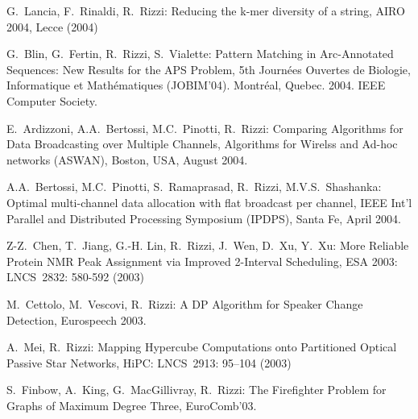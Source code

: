\begin{etaremune}
\vspace{-1.8mm}
  \item {G.~Lancia, F.~Rinaldi, R.~Rizzi:}
   \newblock Reducing the k-mer diversity of a string,
   \newblock AIRO 2004, Lecce (2004)

\vspace{-1.8mm}
  \item {G.~Blin, G.~Fertin, R.~Rizzi, S.~Vialette:}
   \newblock Pattern Matching in Arc-Annotated Sequences: New Results for the APS Problem,
   \newblock 5th Journ\'ees Ouvertes de Biologie, Informatique et Math\'ematiques (JOBIM'04).
   \newblock Montr\'eal, Quebec. 2004.
   \newblock IEEE Computer Society.

\vspace{-1.8mm}
  \item {E.~Ardizzoni, A.A.~Bertossi, M.C.~Pinotti, R.~Rizzi:}
   \newblock Comparing Algorithms for Data Broadcasting over Multiple Channels,
   \newblock Algorithms for Wirelss and Ad-hoc networks (ASWAN),
   \newblock Boston, USA, August 2004.

\vspace{-1.8mm}
  \item {A.A.~Bertossi, M.C.~Pinotti, S.~Ramaprasad, R.~Rizzi, M.V.S.~Shashanka:}
   \newblock Optimal multi-channel data allocation with flat broadcast per channel,
   \newblock IEEE Int’l Parallel and Distributed Processing Symposium (IPDPS),
   \newblock Santa Fe, April 2004.

\vspace{-1.8mm}
  \item {Z-Z.~Chen, T.~Jiang, G.-H. Lin, R.~Rizzi, J.~Wen, D.~Xu, Y.~Xu:}
   \newblock More Reliable Protein NMR Peak Assignment via Improved 2-Interval Scheduling,
   \newblock ESA 2003:
   \newblock LNCS~2832: 580-592 (2003)

\vspace{-1.8mm}
  \item {M.~Cettolo, M.~Vescovi, R.~Rizzi:}
   \newblock  A DP Algorithm  for Speaker Change Detection,
   \newblock Eurospeech 2003.

\vspace{-1.8mm}
  \item {A.~Mei, R.~Rizzi:}
   \newblock Mapping Hypercube Computations onto Partitioned Optical Passive Star Networks,
   \newblock HiPC:
   \newblock  LNCS~2913: 95--104 (2003)

\vspace{-1.8mm}
  \item {S.~Finbow, A.~King, G.~MacGillivray, R.~Rizzi:}
   \newblock The Firefighter Problem for Graphs of Maximum Degree Three,
   \newblock EuroComb'03.


\end{etaremune}
